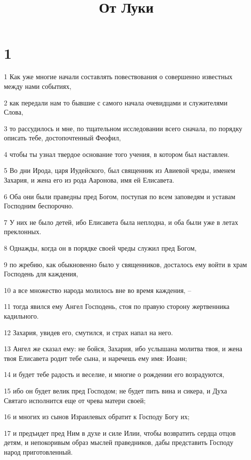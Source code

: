 

\title{От Луки}


\chapter{1}

\par 1 Как уже многие начали составлять повествования о совершенно известных между нами событиях,
\par 2 как передали нам то бывшие с самого начала очевидцами и служителями Слова,
\par 3 то рассудилось и мне, по тщательном исследовании всего сначала, по порядку описать тебе, достопочтенный Феофил,
\par 4 чтобы ты узнал твердое основание того учения, в котором был наставлен.
\par 5 Во дни Ирода, царя Иудейского, был священник из Авиевой чреды, именем Захария, и жена его из рода Ааронова, имя ей Елисавета.
\par 6 Оба они были праведны пред Богом, поступая по всем заповедям и уставам Господним беспорочно.
\par 7 У них не было детей, ибо Елисавета была неплодна, и оба были уже в летах преклонных.
\par 8 Однажды, когда он в порядке своей чреды служил пред Богом,
\par 9 по жребию, как обыкновенно было у священников, досталось ему войти в храм Господень для каждения,
\par 10 а все множество народа молилось вне во время каждения, --
\par 11 тогда явился ему Ангел Господень, стоя по правую сторону жертвенника кадильного.
\par 12 Захария, увидев его, смутился, и страх напал на него.
\par 13 Ангел же сказал ему: не бойся, Захария, ибо услышана молитва твоя, и жена твоя Елисавета родит тебе сына, и наречешь ему имя: Иоанн;
\par 14 и будет тебе радость и веселие, и многие о рождении его возрадуются,
\par 15 ибо он будет велик пред Господом; не будет пить вина и сикера, и Духа Святаго исполнится еще от чрева матери своей;
\par 16 и многих из сынов Израилевых обратит к Господу Богу их;
\par 17 и предъидет пред Ним в духе и силе Илии, чтобы возвратить сердца отцов детям, и непокоривым образ мыслей праведников, дабы представить Господу народ приготовленный.
